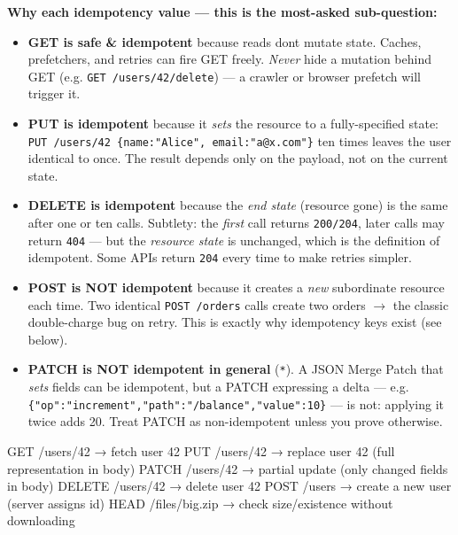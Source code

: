 \documentclass[11pt]{article}
\providecommand{\tightlist}{\setlength{\itemsep}{1pt}\setlength{\parskip}{0pt}}
\newenvironment{Shaded}{\begin{snugshade}}{\end{snugshade}}
\newcommand{\NormalTok}[1]{\textcolor[rgb]{0.81,0.81,0.76}{#1}}
\begin{document}
\textbf{Why each idempotency value --- this is the most-asked sub-question:}

\begin{itemize}
\tightlist
\item
  \textbf{GET is safe \& idempotent} because reads don\textquotesingle t mutate state. Caches, prefetchers, and retries can fire GET freely. \emph{Never} hide a mutation behind GET (e.g. \texttt{GET\ /users/42/delete}) --- a crawler or browser prefetch will trigger it.
\item
  \textbf{PUT is idempotent} because it \emph{sets} the resource to a fully-specified state: \texttt{PUT\ /users/42\ \{name:"Alice",\ email:"a@x.com"\}} ten times leaves the user identical to once. The result depends only on the payload, not on the current state.
\item
  \textbf{DELETE is idempotent} because the \emph{end state} (resource gone) is the same after one or ten calls. Subtlety: the \emph{first} call returns \texttt{200/204}, later calls may return \texttt{404} --- but the \emph{resource state} is unchanged, which is the definition of idempotent. Some APIs return \texttt{204} every time to make retries simpler.
\item
  \textbf{POST is NOT idempotent} because it creates a \emph{new} subordinate resource each time. Two identical \texttt{POST\ /orders} calls create two orders \(\rightarrow\) the classic double-charge bug on retry. This is exactly why idempotency keys exist (see below).
\item
  \textbf{PATCH is NOT idempotent in general} (\texttt{*}). A JSON Merge Patch that \emph{sets} fields can be idempotent, but a PATCH expressing a delta --- e.g. \texttt{\{"op":"increment","path":"/balance","value":10\}} --- is not: applying it twice adds 20. Treat PATCH as non-idempotent unless you prove otherwise.
\end{itemize}


\begin{Shaded}
\begin{Highlighting}[]
\NormalTok{GET    /users/42            → fetch user 42}
\NormalTok{PUT    /users/42            → replace user 42 (full representation in body)}
\NormalTok{PATCH  /users/42            → partial update (only changed fields in body)}
\NormalTok{DELETE /users/42            → delete user 42}
\NormalTok{POST   /users              → create a new user (server assigns id)}
\NormalTok{HEAD   /files/big.zip       → check size/existence without downloading}
\end{Highlighting}
\end{Shaded}
\end{document}
